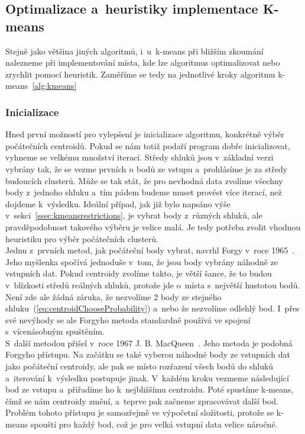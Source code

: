 \subsection{Optimalizace a~heuristiky implementace K-means} \label{ssec:optimization}
Stejně jako většina jiných algoritmů, i~u~k-means při bližším zkoumání nalezneme při implementování místa, kde lze algoritmus optimalizovat nebo zrychlit pomocí heuristik.
Zaměříme se tedy na jednotlivé kroky algoritmu k-means~\ref{alg:kmeans}

\subsubsection{Inicializace}
Hned první možností pro vylepšení je inicializace algoritmu, konkrétně výběr počátečních centroidů. Pokud se nám totiž podaří program dobře inicializovat, vyhneme se velkému množství iterací. Středy shluků jsou v~základní verzi vybrány tak, že se vezme prvních $n$ bodů ze vstupu a~prohlásíme je za středy budoucích clusterů. Může se tak stát, že pro nevhodná data zvolíme všechny body z~jednoho shluku a~tím pádem budeme muset provést více iterací, než dojdeme k~výsledku. Ideální případ, jak již bylo napsáno výše v~sekci~\ref{ssec:kmeansrestrictions}, je vybrat body z~různých shluků, ale pravděpodobnost takového výběru je velice malá. Je tedy potřeba zvolit vhodnou heuristiku pro výběr počátečních clusterů.\\%

Jednu z~prvních metod, jak počáteční body vybrat, navrhl Forgy v~roce 1965~\cite{Anderberg73}. Jeho myšlenka spočívá jednoduše v~tom, že jsou body vybrány náhodně ze vstupních dat. Pokud centroidy zvolíme takto, je větší šance, že to budou v~blízkosti středů reálných shluků, protože jde o~místa s~největší hustotou bodů. Není zde ale žádná záruka, že nezvolíme 2 body ze stejného shluku~(\autoref{eq:centroidChooseProbability}) a~nebo že nezvolíme odlehlý bod. I~přes své nevýhody se ale Forgyho metoda standardně používá ve spojení s~vícenásobným spuštěním.\\

S~další metodou přišel v~roce 1967 J. B. MacQueen~\cite{MacQueen67}. Jeho metoda je podobná Forgyho přístupu. Na začátku se také vyberou náhodné body ze vstupních dat jako počáteční centroidy, ale pak se místo rozřazení všech bodů do shluků a~iterování k~výsledku postupuje jinak. V~každém kroku vezmeme následující bod ze vstupu a~přiřadíme ho k~nejbližšímu centroidu. Poté spustíme k-means, čímž se nám centroidy změní, a~teprve pak začneme zpracovávat další bod. Problém tohoto přístupu je samozřejmě ve výpočetní složitosti, protože se k-means spouští pro každý bod, což je pro velká vstupní data velice náročné.\\

